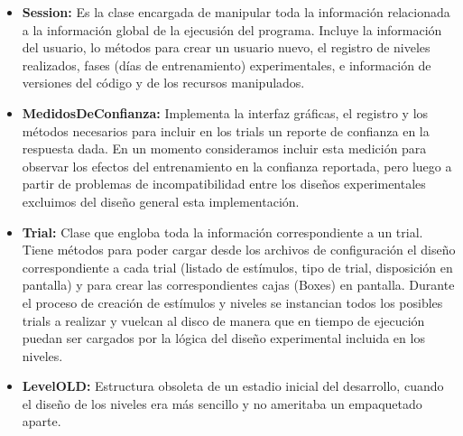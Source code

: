 \documentclass{article}
\numberwithin{figure}{section}
\begin{document}
\begin{itemize}
\begin{itemize}
            \item \textbf{Session:} Es la clase encargada de manipular toda la información relacionada a la información global de la ejecusión del programa. Incluye la información del usuario, lo métodos para crear un usuario nuevo, el registro de niveles realizados, fases (días de entrenamiento) experimentales, e información de versiones del código y de los recursos manipulados. 
            \item \textbf{MedidosDeConfianza:} Implementa la interfaz gráficas, el registro y los métodos necesarios para incluir en los trials un reporte de confianza en la respuesta dada. En un momento consideramos incluir esta medición para observar los efectos del entrenamiento en la confianza reportada, pero luego a partir de problemas de incompatibilidad entre los diseños experimentales excluimos del diseño general esta implementación. 
            \item \textbf{Trial:} Clase que engloba toda la información correspondiente a un trial. Tiene métodos para poder cargar desde los archivos de configuración el diseño correspondiente a cada trial (listado de estímulos, tipo de trial, disposición en pantalla) y para crear las correspondientes cajas (Boxes) en pantalla. Durante el proceso de creación de estímulos y niveles se instancian todos los posibles trials a realizar y vuelcan al disco de manera que en tiempo de ejecución puedan ser cargados por la lógica del diseño experimental incluida en los niveles.
            \item \textbf{LevelOLD:} Estructura obsoleta de un estadio inicial del desarrollo, cuando el diseño de los niveles era más sencillo y no ameritaba un empaquetado aparte. 
            
        \end{itemize}
        

\end{itemize}
\end{document}
